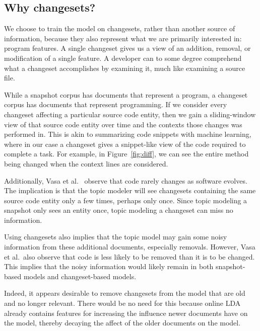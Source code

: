 

\subsection{Why changesets?}

We choose to train the model on changesets, rather than another source of
information, because they also represent what we are primarily interested in:
program features.  A single changeset gives us a view of an addition, removal,
or modification of a single feature.  A developer can to some degree comprehend
what a changeset accomplishes by examining it, much like examining a source
file.

While a snapshot corpus has documents that represent a program, a changeset
corpus has documents that represent programming.  If we consider every changeset
affecting a particular source code entity, then we gain a sliding-window view of
that source code entity over time and the contexts those changes was performed
in.  This is akin to summarizing code snippets with machine
learning\cite{Ying-Robillard:2013}, where in our case a changeset gives
a snippet-like view of the code required to complete a task.
For example, in Figure~\ref{fig:diff}, we can see the entire method being changed
when the context lines are considered.

Additionally, Vasa et al.~\cite{Vasa-etal:2007} observe that code rarely changes
as software evolves. The implication is that the topic modeler will see
changesets containing the same source code entity only a few times, perhaps only
once.  Since topic modeling a snapshot only sees an entity once, topic modeling
a changeset can miss no information.

Using changesets also implies that the topic model may gain some noisy
information from these additional documents, especially removals.  However, Vasa
et al.\ also observe that code is less likely to be removed than it is to be
changed. This implies that the noisy information would likely remain in both
snapshot-based models and changeset-based models.

Indeed, it appears desirable to remove changesets from the model that are old
and no longer relevant. There would be no need for this because online LDA
already contains features for increasing the influence newer documents have on
the model, thereby decaying the affect of the older documents on the model.


